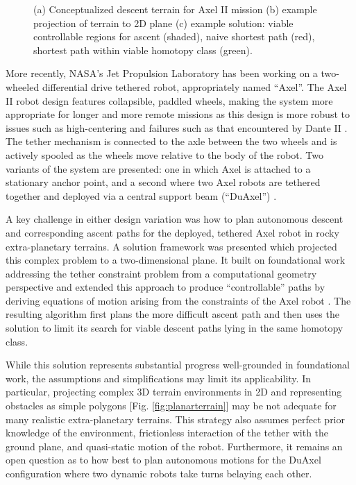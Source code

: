 \documentclass[12pt]{article}
\begin{document}
\begin{figure}
\begin{subfigure}{.2\textwidth}
    \caption{}
    \label{fig:planarpath}
  \end{subfigure}  %
  \label{fig:dsolution}
  \vspace{-0.1in}
  \caption{(a) Conceptualized descent terrain for Axel II mission (b) example projection of terrain to 2D plane
  (c) example solution: viable controllable regions for ascent (shaded), naive shortest path (red), shortest path within 
  viable homotopy class (green). }
\end{figure}


More recently, NASA's Jet Propulsion Laboratory has been working on a
two-wheeled differential drive tethered robot, appropriately named
``Axel''. The Axel II robot design features collapsible, paddled
wheels, making the system more appropriate for longer and more remote
missions as this design is more robust to issues such as
high-centering and failures such as that encountered by Dante II
\cite{axel_design}. The tether mechanism is connected to the axle
between the two wheels and is actively spooled as the wheels move
relative to the body of the robot.  Two variants of the system are
presented: one in which Axel is attached to a stationary anchor point,
and a second where two Axel robots are tethered together and deployed
via a central support beam (``DuAxel'') \cite{duaxel}.


A key challenge in either design variation was how to plan autonomous
descent and corresponding ascent paths for the deployed, tethered Axel
robot in rocky extra-planetary terrains.  A solution
framework was presented which projected this complex problem to a
two-dimensional plane. It built on foundational work addressing the
tether constraint problem from a computational geometry perspective
\cite{ties_that_bind, min_homotopies} and extended this approach to
produce ``controllable'' paths by deriving equations of motion arising
from the constraints of the Axel robot \cite{axel_planning}. The
resulting algorithm first plans the more difficult ascent path and
then uses the solution to limit its search for viable descent paths
lying in the same homotopy class.


While this solution represents substantial progress well-grounded in
foundational work, the assumptions and simplifications may limit its
applicability. In particular, projecting complex 3D terrain
environments in 2D and representing obstacles as simple polygons
[Fig. \ref{fig:planarterrain}] may be not adequate for many realistic
extra-planetary terrains.  This strategy also assumes perfect prior
knowledge of the environment, frictionless interaction of the tether
with the ground plane, and quasi-static motion of the robot.
Furthermore, it remains an open question as to how best to plan
autonomous motions for the DuAxel configuration where two dynamic
robots take turns belaying each other.
\end{document}
